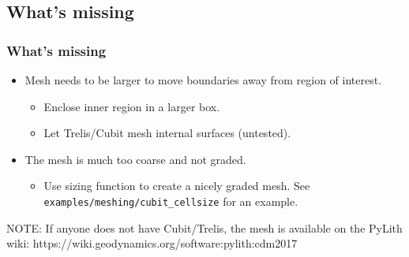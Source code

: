 \documentclass{beamer}
\newcommand{\important}[1]{{\color{red}#1}}
\begin{document}
\subsection{What's missing}

\begin{frame}
  \frametitle{What's missing}
  
  \begin{itemize}
  \item Mesh needs to be larger to move boundaries away from region of
    interest.
    \begin{itemize}
    \item Enclose inner region in a larger box.
    \item Let Trelis/Cubit mesh internal surfaces (untested).
    \end{itemize}
  \item The mesh is much too coarse and not graded.
    \begin{itemize}
    \item Use sizing function to create a nicely graded mesh. See
      \important{\tt examples/meshing/cubit\_cellsize} for an example.
    \end{itemize}
  \end{itemize}

\vfill
NOTE:  If anyone does not have Cubit/Trelis, the mesh is available on the
PyLith wiki:
\important{https://wiki.geodynamics.org/software:pylith:cdm2017}
 
\end{frame}



\end{document}
